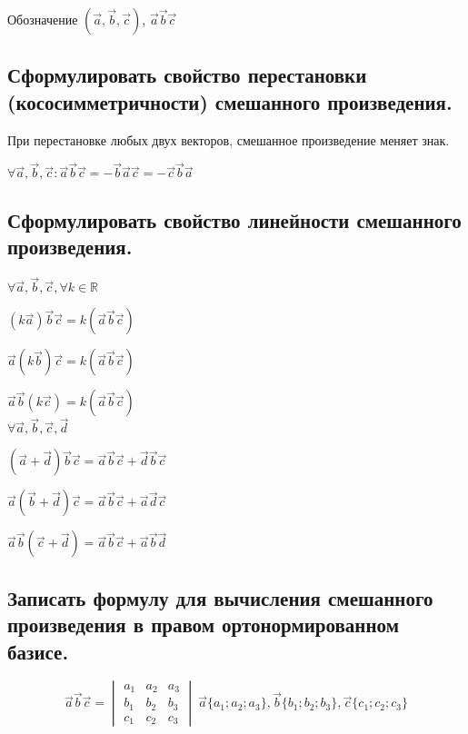 \documentclass[a4paper, 10pt]{article}
\begin{document}
Обозначение $(\vec{a}, \vec{b}, \vec{c})$, $\vec{a} \vec{b} \vec{c}$

\subsection{Сформулировать свойство перестановки (кососимметричности) смешанного произведения.}

При перестановке любых двух векторов, смешанное произведение меняет знак.

$\forall \vec{a}, \vec{b}, \vec{c}:\vec{a} \vec{b} \vec{c} = - 
\vec{b} \vec{a} \vec{c} = - \vec{c} \vec{b} \vec{a}$

\subsection{Сформулировать свойство линейности смешанного произведения.}

\begin{center}
$\forall \vec{a}, \vec{b}, \vec{c}, \forall k \in \mathbb{R}$

$(k\vec{a})\vec{b}\vec{c} = k(\vec{a}\vec{b}\vec{c})$

$\vec{a}(k\vec{b})\vec{c} = k(\vec{a}\vec{b}\vec{c})$

$\vec{a}\vec{b}(k\vec{c}) = k(\vec{a}\vec{b}\vec{c})$\\

$\forall \vec{a}, \vec{b}, \vec{c}, \vec{d}$

$(\vec{a}+\vec{d})\vec{b}\vec{c} = \vec{a}\vec{b}\vec{c} + \vec{d}\vec{b}\vec{c}$

$\vec{a}(\vec{b}+\vec{d})\vec{c} = \vec{a}\vec{b}\vec{c} + \vec{a}\vec{d}\vec{c}$

$\vec{a}\vec{b}(\vec{c}+\vec{d}) = \vec{a}\vec{b}\vec{c} + \vec{a}\vec{b}\vec{d}$
\end{center}

\subsection{Записать формулу для вычисления смешанного произведения в правом ортонормированном базисе.}

$$\vec{a}\vec{b}\vec{c} = 
\begin{vmatrix}
    a_1 & a_2 & a_3\\
    b_1 & b_2 & b_3\\
    c_1 & c_2 & c_3
\end{vmatrix} \ \vec{a}\{a_1;a_2;a_3\},
\vec{b}\{b_1;b_2;b_3\}, \vec{c}\{c_1;c_2;c_3\}$$
\end{document}
